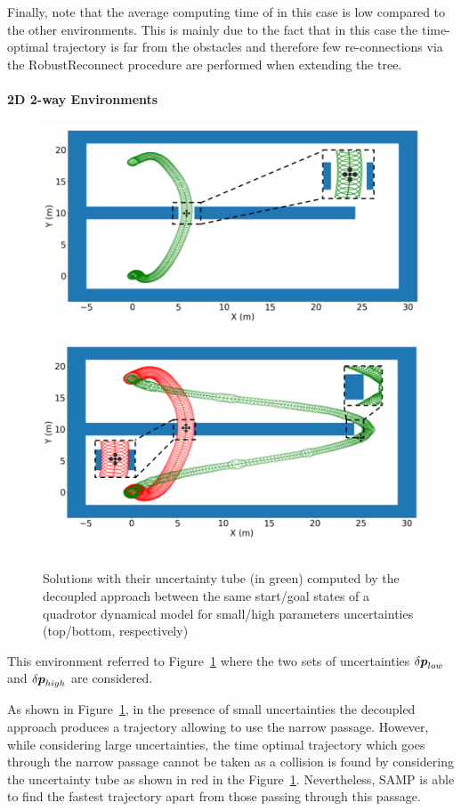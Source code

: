 Finally, note that the average computing time of  in this case is low compared to the other environments. 
This is mainly due to the fact that in this case the time-optimal trajectory is far from the obstacles and therefore few re-connections via the  RobustReconnect procedure are performed when extending the tree.

\paragraph{2D 2-way Environments} 

\begin{figure}[t]
    \centering
    \includegraphics[width=0.7\linewidth]{figures/samp/Contribution-example1.png}
    \includegraphics[width=0.7\linewidth]{figures/samp/Contribution-example2.png}
    \caption{Solutions with their uncertainty tube (in green) computed by the decoupled approach between the same start/goal states of a quadrotor dynamical model for small/high parameters uncertainties (top/bottom, respectively)}
    \label{fig:2way}
\end{figure}

This environment referred to Figure~\ref{fig:2way} where the two sets of uncertainties $\delta\boldsymbol{p}_{low}$ and $\delta\boldsymbol{p}_{high}$ are considered.

As shown in Figure~\ref{fig:2way}, in the presence of small uncertainties the decoupled approach produces a trajectory allowing to use the narrow passage. 
However, while considering large uncertainties, the time optimal trajectory which goes through the narrow passage cannot be taken as a collision is found by considering the uncertainty tube as shown in red in the Figure~\ref{fig:2way}.
Nevertheless, SAMP is able to find the fastest trajectory apart from those passing through this passage.


